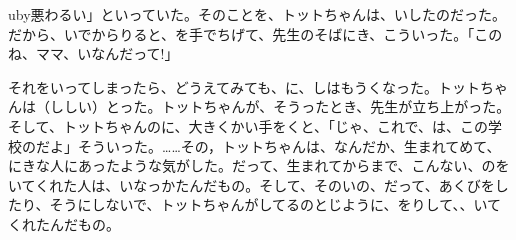 uby{悪}{わる}い」といっていた。そのことを、トットちゃんは、いしたのだった。だから、いでからりると、を手でちげて、先生のそばにき、こういった。「このね、ママ、いなんだって!」

                                                                                                                                                                                                                                                                                                                                                                                                                                                                                                                                                                                                                                                                          それをいってしまったら、どうえてみても、に、しはもうくなった。トットちゃんは（ししい）とった。トットちゃんが、そうったとき、先生が立ち上がった。そして、トットちゃんのに、大きくかい手をくと、「じゃ、これで、は、この学校のだよ」そういった。……その，トットちゃんは、なんだか、生まれてめて、にきな人にあったような気がした。だって、生まれてからまで、こんない、のをいてくれた人は、いなっかたんだもの。そして、そのいの、だって、あくびをしたり、そうにしないで、トットちゃんがしてるのとじように、をりして、、いてくれたんだもの。

